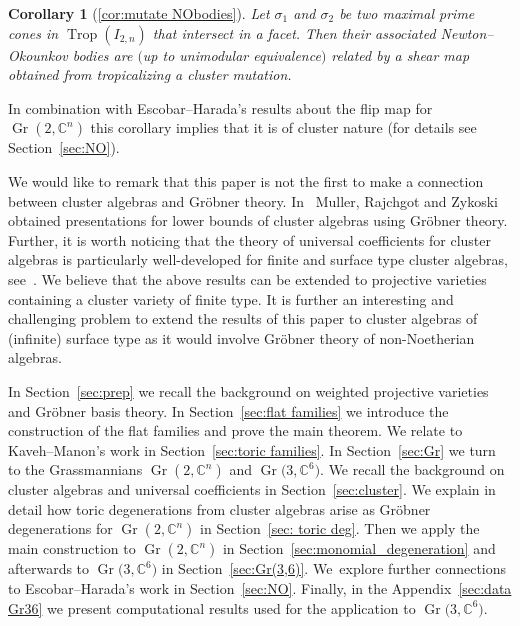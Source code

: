 \documentclass[10pt,a4paper]{amsart}
\newcommand{\thref}[1]{\ref{#1}}
\newtheorem{Corollary}[Theorem]{Corollary}
\numberwithin{equation}{section}
\DeclareMathOperator{\Gr}{Gr}
\DeclareMathOperator{\trop}{Trop}
\begin{document}
\begin{Corollary}[\thref{cor:mutate NObodies}]
Let $\sigma_1$ and $\sigma_2$ be two maximal prime cones in $\trop(I_{2,n})$ that intersect in a facet. Then their associated Newton--Okounkov bodies
are $($up to unimodular equivalence$)$ related by a shear map obtained from tropicalizing a cluster mutation.
\end{Corollary}

In combination with Escobar--Harada's results about the flip map for $\Gr(2,\mathbb C^n)$ this corollary implies that it is of cluster nature (for details see Section~\ref{sec:NO}).

We would like to remark that this paper is not the first to make a connection between cluster algebras and Gr\"obner theory.
In~\cite{MRZ18} Muller, Rajchgot and Zykoski obtained presentations for lower bounds of cluster algebras using Gr\"obner theory.
Further, it is worth noticing that the theory of universal coefficients for cluster algebras is particularly well-developed for finite and surface type cluster algebras, see~\cite{Rea_surface}.
We believe that the above results can be extended to projective varieties containing a cluster variety of finite type.
It is further an interesting and challenging problem to extend the results of this paper to cluster algebras of (infinite) surface type as it would involve Gr\"obner theory of non-Noetherian algebras.

\medskip

 In Section~\ref{sec:prep} we recall the background on weighted projective varieties and Gr\"obner basis theory.
In Section~\ref{sec:flat families} we introduce the construction of the flat families and prove the main theorem.
We relate to Kaveh--Manon's work in Section~\ref{sec:toric families}.
In Section~\ref{sec:Gr} we turn to the Grassmannians $\Gr(2,\mathbb C^n)$ and $\Gr\big(3,\mathbb C^6\big)$.
We recall the background on cluster algebras and universal coefficients in Section~\ref{sec:cluster}.
We explain in detail how toric degenerations from cluster algebras arise as Gr\"obner degenerations for $\Gr(2,\mathbb C^n)$ in Section~\ref{sec: toric deg}.
Then we apply the main construction to $\Gr(2,\mathbb C^n)$ in Section~\ref{sec:monomial_degeneration} and afterwards to $\Gr\big(3,\mathbb C^6\big)$ in Section~\ref{sec:Gr(3,6)}.
We~explore further connections to Escobar--Harada's work in Section~\ref{sec:NO}.
Finally, in the Appendix~\ref{sec:data Gr36} we present computational results used for the application to $\Gr\big(3,\mathbb C^6\big)$.
\end{document}
